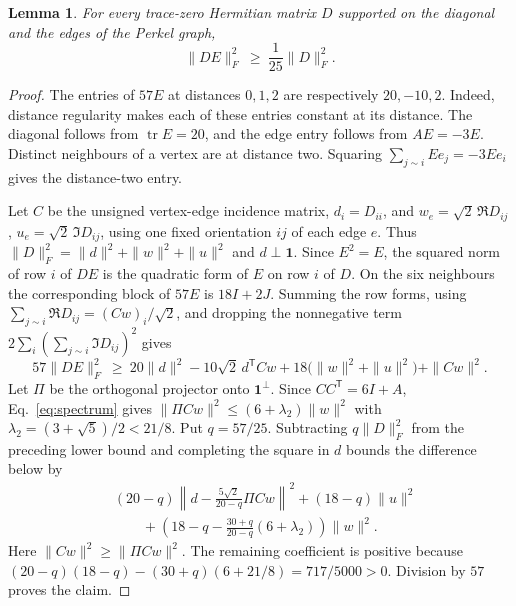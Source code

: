 \documentclass[11pt]{article}
\newtheorem{lemma}[theorem]{Lemma}
\newcommand{\one}{\mathbf 1}
\newcommand{\tr}{\operatorname{tr}}
\begin{document}
\begin{lemma}\label{lem:perkel-coercivity}
For every trace-zero Hermitian matrix $D$ supported on the diagonal and
the edges of the Perkel graph,
\[
                   \|DE\|_F^2\ \geq\ \frac{1}{25}\|D\|_F^2 .
\]
\end{lemma}
\begin{proof}
The entries of $57E$ at distances $0,1,2$ are respectively $20,-10,2$.
Indeed, distance regularity makes each of these entries constant at its
distance. The diagonal follows from $\tr E=20$, and the edge entry
follows from $AE=-3E$. Distinct neighbours of a vertex are at distance
two. Squaring $\sum_{j\sim i}Ee_j=-3Ee_i$ gives the distance-two entry.

Let $C$ be the unsigned vertex-edge incidence matrix, $d_i=D_{ii}$,
and $w_e=\sqrt2\,\Re D_{ij}$, $u_e=\sqrt2\,\Im D_{ij}$, using one fixed
orientation $ij$ of each edge $e$. Thus
$\|D\|_F^2=\|d\|^2+\|w\|^2+\|u\|^2$ and $d\perp\one$.
Since $E^2=E$, the squared norm of row $i$ of $DE$ is the quadratic form
of $E$ on row $i$ of $D$. On the six neighbours the corresponding block
of $57E$ is $18I+2J$. Summing the row forms, using
$\sum_{j\sim i}\Re D_{ij}=(Cw)_i/\sqrt2$, and dropping the nonnegative
term $2\sum_i(\sum_{j\sim i}\Im D_{ij})^2$ gives
\[
 57\|DE\|_F^2\ \geq\
 20\|d\|^2-10\sqrt2\,d^{\mathsf T}Cw+
 18\bigl(\|w\|^2+\|u\|^2\bigr)+\|Cw\|^2 .
\]
Let $\Pi$ be the orthogonal projector onto $\one^\perp$. Since
$CC^{\mathsf T}=6I+A$, Eq.~\eqref{eq:spectrum} gives
$\|\Pi Cw\|^2\leq(6+\lambda_2)\|w\|^2$ with
$\lambda_2=(3+\sqrt5)/2<21/8$. Put $q=57/25$. Subtracting
$q\|D\|_F^2$ from the preceding lower bound and completing the square
in $d$ bounds the difference below by
\[
\begin{split}
 &(20-q)\left\|d-\frac{5\sqrt2}{20-q}\Pi Cw\right\|^2
 +(18-q)\|u\|^2\\
 &\qquad+
 \left(18-q-\frac{30+q}{20-q}(6+\lambda_2)\right)\|w\|^2 .
\end{split}
\]
Here $\|Cw\|^2\geq\|\Pi Cw\|^2$. The remaining coefficient is positive
because $(20-q)(18-q)-(30+q)(6+21/8)=717/5000>0$. Division by $57$
proves the claim.
\end{proof}
\end{document}
